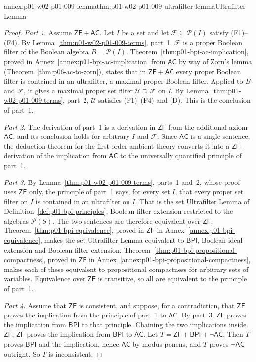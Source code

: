\begin{annexitem}{annex:p01-w02-p01-009-lemma}{thm:p01-w02-p01-009-ultrafilter-lemma}{Ultrafilter Lemma}
\begin{proof}
\emph{Part 1.} Assume \(\mathsf{ZF}+\mathsf{AC}\). Let \(I\) be a set and
let \(\mathcal F\subseteq\mathcal P(I)\) satisfy (F1)--(F4). By
Lemma~\ref{thm:p01-w02-p01-009-terms}, part~1, \(\mathcal F\) is a proper
Boolean filter of the Boolean algebra \(B=\mathcal P(I)\).
Theorem~\ref{thm:p01-bpi-ac-implication}, proved in
Annex~\ref{annex:p01-bpi-ac-implication} from \(\mathsf{AC}\) by way of
Zorn's lemma (Theorem~\ref{thm:p06-ac-to-zorn}), states that in
\(\mathsf{ZF}+\mathsf{AC}\) every proper Boolean filter is contained in an
ultrafilter, a maximal proper Boolean filter. Applied to \(B\) and
\(\mathcal F\), it gives a maximal proper set filter
\(\mathcal U\supseteq\mathcal F\) on \(I\). By
Lemma~\ref{thm:p01-w02-p01-009-terms}, part~2, \(\mathcal U\) satisfies
(F1)--(F4) and (D). This is the conclusion of part~1.

\emph{Part 2.} The derivation of part~1 is a derivation in
\(\mathsf{ZF}\) from the additional axiom \(\mathsf{AC}\), and its
conclusion holds for arbitrary \(I\) and \(\mathcal F\). Since
\(\mathsf{AC}\) is a single sentence, the deduction theorem for the
first-order ambient theory converts it into a \(\mathsf{ZF}\)-derivation of
the implication from \(\mathsf{AC}\) to the universally quantified principle
of part~1.

\emph{Part 3.} By Lemma~\ref{thm:p01-w02-p01-009-terms}, parts~1 and~2,
whose proof uses \(\mathsf{ZF}\) only, the principle of part~1 says, for every
set \(I\), that every proper set filter on \(I\) is contained in an
ultrafilter on \(I\). That is the set Ultrafilter Lemma of
Definition~\ref{def:p01-bpi-principles}, Boolean filter extension restricted
to the algebras \(\mathcal P(S)\). The two sentences are therefore
equivalent over \(\mathsf{ZF}\). Theorem~\ref{thm:p01-bpi-equivalence},
proved in \(\mathsf{ZF}\) in Annex~\ref{annex:p01-bpi-equivalence}, makes
the set Ultrafilter Lemma equivalent to \(\mathsf{BPI}\), Boolean ideal
extension and Boolean filter extension.
Theorem~\ref{thm:p01-bpi-propositional-compactness}, proved in
\(\mathsf{ZF}\) in Annex~\ref{annex:p01-bpi-propositional-compactness},
makes each of these equivalent to propositional compactness for arbitrary
sets of variables. Equivalence over \(\mathsf{ZF}\) is transitive, so all
are equivalent to the principle of part~1.

\emph{Part 4.} Assume that \(\mathsf{ZF}\) is consistent, and suppose, for
a contradiction, that \(\mathsf{ZF}\) proves the implication from the
principle of part~1 to \(\mathsf{AC}\). By part~3, \(\mathsf{ZF}\) proves the
implication from \(\mathsf{BPI}\) to that principle. Chaining the two
implications inside \(\mathsf{ZF}\), \(\mathsf{ZF}\) proves the implication
from \(\mathsf{BPI}\) to \(\mathsf{AC}\). Let
\(T=\mathsf{ZF}+\mathsf{BPI}+\neg\mathsf{AC}\). Then \(T\) proves
\(\mathsf{BPI}\) and the implication, hence \(\mathsf{AC}\) by modus ponens,
and \(T\) proves \(\neg\mathsf{AC}\) outright. So \(T\) is inconsistent.


\end{proof}
\end{annexitem}
